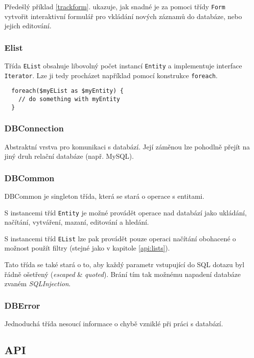 \documentclass[12pt]{article}
\begin{document}
Předešlý příklad \ref{trackform}. ukazuje, jak snadné je za pomoci třídy \texttt{Form} vytvořit interaktivní formulář pro vkládání nových záznamů do databáze, nebo jejich editování.

\subsubsection{Elist}
Třída \texttt{EList} obsahuje libovolný počet instancí \texttt{Entity} a implementuje interface \texttt{Iterator}. Lze ji tedy procházet například pomocí konstrukce \texttt{foreach}.

\begin{lstlisting}
  foreach($myEList as $myEntity) {
    // do something with myEntity
  }
\end{lstlisting}

\subsubsection{DBConnection}
Abstraktní vrstva pro komunikaci s databází. Její záměnou lze pohodlně přejít na jiný druh relační databáze (např. MySQL).

\subsubsection{DBCommon}
DBCommon je singleton třída, která se stará o operace s entitami.\newline

S instancemi tříd \texttt{Entity} je možné provádět operace nad databází jako ukládání, načítání, vytváření, mazaní, editování a hledání.\newline

S instancemi tříd \texttt{EList} lze pak provádět pouze operaci načítání obohacené o možnost použít filtry (stejné jako v kapitole \ref{api:lists}).\newline

Tato třída se také stará o to, aby každý parametr vstupující do SQL dotazu byl řádně ošetřený (\emph{escaped} \& \emph{quoted}). Brání tím tak možnému napadení databáze zvaném \emph{SQLInjection}.

\subsubsection{DBError}
Jednoduchá třída nesoucí informace o chybě vzniklé při práci s databází.

\subsection{API}
\end{document}
